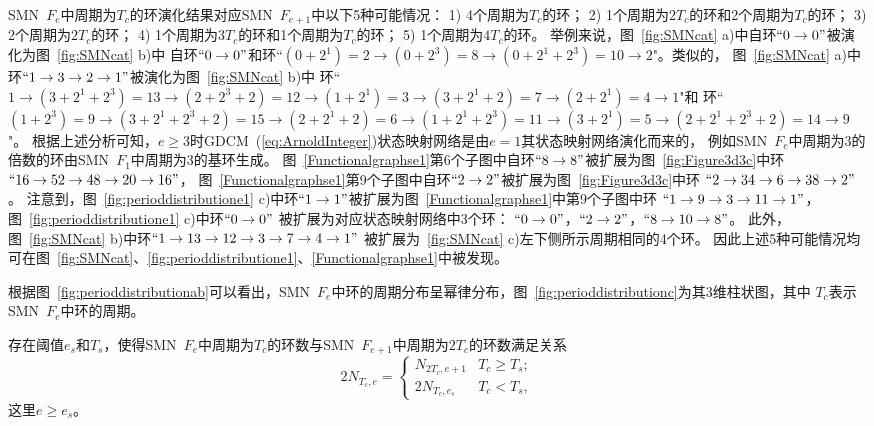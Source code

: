 SMN\ $F_e$中周期为$T_c$的环演化结果对应SMN\ $F_{e+1}$中以下5种可能情况：
1) 4个周期为$T_c$的环； 2) 1个周期为$2T_c$的环和2个周期为$T_c$的环； 3) 2个周期为$2T_c$的环；
4) 1个周期为$3T_c$的环和1个周期为$T_c$的环； 5) 1个周期为$4T_c$的环。
举例来说，图~\ref{fig:SMNcat} a)中自环$``0\rightarrow 0"$被演化为图~\ref{fig:SMNcat} b)中
自环$``0\rightarrow 0"$和环``$(0+2^1)=2\rightarrow (0+2^3)=8\rightarrow (0+2^1+2^3)=10\rightarrow 2$"。类似的，
图~\ref{fig:SMNcat} a)中环$``1\rightarrow 3\rightarrow 2\rightarrow 1"$被演化为图~\ref{fig:SMNcat} b)中
环``$1 \rightarrow (3+2^1+2^3)=13 \rightarrow (2+2^3+2)=12 \rightarrow (1+2^1)=3 \rightarrow (3+2^1+2)=7
\rightarrow (2+2^1)=4 \rightarrow 1$"和
环``$(1+2^3)=9\rightarrow (3+2^1+2^3+2)=15 \rightarrow (2+2^1+2)=6 \rightarrow (1+2^1+2^3)=11 \rightarrow (3+2^1)=5
\rightarrow (2+2^1+2^3+2)=14 \rightarrow 9$"。
根据上述分析可知，$e\ge 3$时GDCM~(\ref{eq:ArnoldInteger})状态映射网络是由$e=1$其状态映射网络演化而来的，
例如SMN\ $F_e$中周期为3的倍数的环由SMN\ $F_1$中周期为3的基环生成。
图~\ref{Functionalgraphse1}第6个子图中自环$``8\rightarrow 8"$被扩展为图~\ref{fig:Figure3d3c}中环
$``16\rightarrow 52 \rightarrow 48 \rightarrow 20 \rightarrow 16"$，
图~\ref{Functionalgraphse1}第9个子图中自环$``2\rightarrow 2"$被扩展为图~\ref{fig:Figure3d3c}中环
$``2\rightarrow 34 \rightarrow 6 \rightarrow 38 \rightarrow 2"$。
注意到，图~\ref{fig:perioddistributione1} c)中环$``1\rightarrow 1"$被扩展为图~\ref{Functionalgraphse1}中第9个子图中环
$``1\rightarrow 9 \rightarrow 3 \rightarrow 11 \rightarrow 1"$，图~\ref{fig:perioddistributione1} c)中环$``0\rightarrow 0"$
被扩展为对应状态映射网络中3个环：
$``0\rightarrow 0"$，$``2\rightarrow 2"$，$``8\rightarrow 10\rightarrow 8"$。
此外，图~\ref{fig:SMNcat} b)中环$``1\rightarrow 13 \rightarrow 12 \rightarrow 3 \rightarrow 7 \rightarrow 4 \rightarrow 1"$
被扩展为~\ref{fig:SMNcat} c)左下侧所示周期相同的4个环。
因此上述5种可能情况均可在图~\ref{fig:SMNcat}、\ref{fig:perioddistributione1}、\ref{Functionalgraphse1}中被发现。

根据图~\ref{fig:perioddistributionab}可以看出，SMN\ $F_e$中环的周期分布呈幂律分布，图~\ref{fig:perioddistributionc}为其3维柱状图，其中
$T_c$表示SMN\ $F_e$中环的周期。

\begin{Conjecture}
存在阈值$e_{s}$和$T_{s}$，使得SMN\ $F_e$中周期为$T_c$的环数与SMN\ $F_{e+1}$中周期为$2T_c$的环数满足关系
\begin{equation}
  2 N_{T_c, e}=
  \left.\begin{cases}
  N_{2T_c, e+1}       & T_c\ge T_{s};\\
  2 N_{T_c, e_s}      & T_c<T_{s},
  \end{cases}\right.
  \label{thresholdCondition}
\end{equation}
这里$e\ge e_{s}$。
\label{Conjecture:eTc}
\end{Conjecture}

